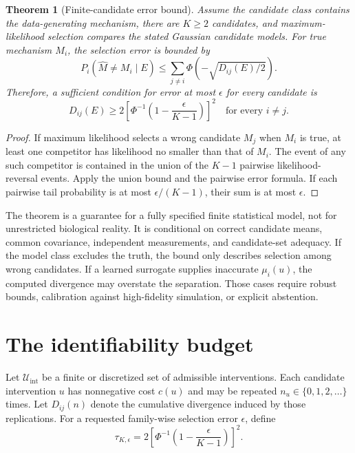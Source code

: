 \documentclass[11pt]{article}
\newtheorem{theorem}{Theorem}[section]
\newcommand{\Ucal}{\mathcal{U}}
\begin{document}
\begin{theorem}[Finite-candidate error bound]
Assume the candidate class contains the data-generating mechanism, there are $K\geq2$ candidates, and maximum-likelihood selection compares the stated Gaussian candidate models. For true mechanism $M_i$, the selection error is bounded by
\begin{equation}
P_i(\widehat M\ne M_i\mid E)\leq\sum_{j\ne i}\Phi\!\left(-\sqrt{D_{ij}(E)/2}\right).
\end{equation}
Therefore, a sufficient condition for error at most $\epsilon$ for every candidate is
\begin{equation}
D_{ij}(E)\geq 2\left[\Phi^{-1}\!\left(1-\frac{\epsilon}{K-1}\right)\right]^2\quad\text{for every }i\ne j.
\end{equation}
\end{theorem}
\begin{proof}
If maximum likelihood selects a wrong candidate $M_j$ when $M_i$ is true, at least one competitor has likelihood no smaller than that of $M_i$. The event of any such competitor is contained in the union of the $K-1$ pairwise likelihood-reversal events. Apply the union bound and the pairwise error formula. If each pairwise tail probability is at most $\epsilon/(K-1)$, their sum is at most $\epsilon$.
\end{proof}

The theorem is a guarantee for a fully specified finite statistical model, not for unrestricted biological reality. It is conditional on correct candidate means, common covariance, independent measurements, and candidate-set adequacy. If the model class excludes the truth, the bound only describes selection among wrong candidates. If a learned surrogate supplies inaccurate $\mu_i(u)$, the computed divergence may overstate the separation. Those cases require robust bounds, calibration against high-fidelity simulation, or explicit abstention.

\section{The identifiability budget}
Let $\Ucal_{\mathrm{int}}$ be a finite or discretized set of admissible interventions. Each candidate intervention $u$ has nonnegative cost $c(u)$ and may be repeated $n_u\in\{0,1,2,\ldots\}$ times. Let $D_{ij}(n)$ denote the cumulative divergence induced by those replications. For a requested family-wise selection error $\epsilon$, define
\begin{equation}
\tau_{K,\epsilon}=2\left[\Phi^{-1}\!\left(1-\frac{\epsilon}{K-1}\right)\right]^2.
\end{equation}
\end{document}
